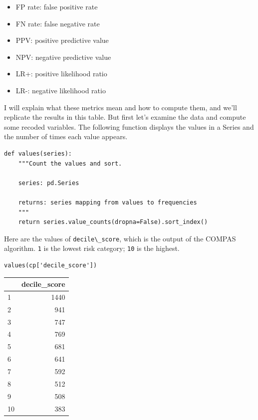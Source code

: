 \begin{itemize}

\item
  FP rate: false positive rate
\item
  FN rate: false negative rate
\item
  PPV: positive predictive value
\item
  NPV: negative predictive value
\item
  LR+: positive likelihood ratio
\item
  LR-: negative likelihood ratio
\end{itemize}

I will explain what these metrics mean and how to compute them, and
we'll replicate the results in this table. But first let's examine the
data and compute some recoded variables. The following function displays
the values in a Series and the number of times each value appears.

\begin{lstlisting}[]
def values(series):
    """Count the values and sort.
    
    series: pd.Series
    
    returns: series mapping from values to frequencies
    """
    return series.value_counts(dropna=False).sort_index()
\end{lstlisting}

Here are the values of \passthrough{\lstinline!decile\_score!}, which is
the output of the COMPAS algorithm. \passthrough{\lstinline!1!} is the
lowest risk category; \passthrough{\lstinline!10!} is the highest.

\begin{lstlisting}[]
values(cp['decile_score'])
\end{lstlisting}

\begin{tabular}{lr}
\midrule
{} &  decile\_score \\
\midrule
1  &          1440 \\
2  &           941 \\
3  &           747 \\
4  &           769 \\
5  &           681 \\
6  &           641 \\
7  &           592 \\
8  &           512 \\
9  &           508 \\
10 &           383 \\
\midrule
\end{tabular}

